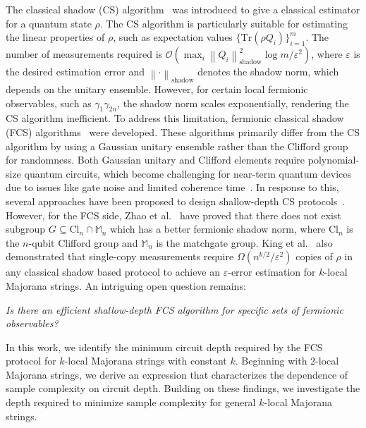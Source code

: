 \documentclass[journal=jctcce,a4paper,manuscript=article]{achemso}
\newcommand{\vabs}[1]{\left\| #1 \right\|}
\newcommand{\cbra}[1]{\{ #1 \}}
\newcommand{\pbra}[1]{\left( #1 \right)}
\newcommand{\tra}[1]{\text{Tr}\left( #1 \right)}
\newcommand{\Ord}[1]{\mathcal{O}\left( #1 \right)}
\newcommand{\Mbb}{\mathbb{M}}
\begin{document}
The classical shadow (CS) algorithm~\cite{huang2020predicting} was introduced
to give a classical estimator for a quantum state $\rho$. The CS algorithm is
particularly suitable for estimating the linear properties of $\rho$, such as
expectation values $\cbra{\tra{\rho Q_i}}_{i=1}^m$. The number of measurements
required is $\Ord{\max_i \vabs{Q_i}^2_{\text{shadow}} \log m / \varepsilon^2}$,
where $\varepsilon$ is the desired estimation error and
$\vabs{\cdot}_{\text{shadow}}$ denotes the shadow norm, which depends on the
unitary ensemble. However, for certain local fermionic observables, such as
$\gamma_1\gamma_{2n}$, the shadow norm scales exponentially, rendering the CS
algorithm inefficient. To address this limitation, fermionic classical shadow
(FCS) algorithms~\cite{bonet2020nearly, Zhao21Fermionic, low2022classical,
  wan2022matchgate, zhao2024group,heyraud2024unified} were developed. These
algorithms primarily differ from the CS algorithm by using a Gaussian unitary
ensemble rather than the Clifford group for randomness. Both Gaussian unitary
and Clifford elements require polynomial-size quantum circuits, which become
challenging for near-term quantum devices due to issues like gate noise and
limited coherence time~\cite{patel2008optimal, jiang2020optimal,
  jiang2018quantum, arute2019quantum, Wu21Strong, cao2023generation}. In response
to this, several approaches have been proposed to design shallow-depth CS
protocols~\cite{bertoni2024shallow, schuster2024random,
  rozon2024optimal,ma2024construct}. However, for the FCS side, Zhao et
al.~\cite{Zhao21Fermionic} have proved that there does not exist subgroup
$G\subseteq \text{Cl}_n \cap \Mbb_n$ which has a better fermionic shadow norm,
where Cl$_n$ is the $n$-qubit Clifford group and $\Mbb_n$ is the matchgate
group. King et al.~\cite{king2024triply} also demonstrated that single-copy
measurements require $\Omega\pbra{n^{k/2}/\varepsilon^2}$ copies of $\rho$ in
any classical shadow based protocol to achieve an $\varepsilon$-error
estimation for $k$-local Majorana strings. An intriguing open question remains:
\begin{center}
  \textit{Is there an efficient shallow-depth FCS algorithm for specific sets of fermionic observables?}
\end{center}

In this work, we identify the minimum circuit depth required by the FCS
protocol for $k$-local Majorana strings with constant $k$. Beginning with
2-local Majorana strings, we derive an expression that characterizes the
dependence of sample complexity on circuit depth. Building on these findings,
we investigate the depth required to minimize sample complexity for general
$k$-local Majorana strings.
\end{document}
